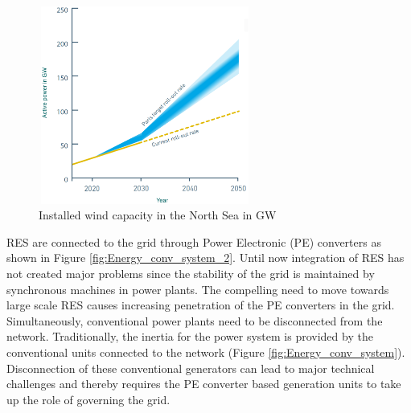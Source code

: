 \begin{figure}[H]
\centering
    \includegraphics[height = 6.5cm,width = 7cm]{Diagrams/Chapter_1/Paris.pdf}
    \caption{Installed wind capacity in the North Sea in GW \cite{noauthor_vision_nodate}}
    \label{fig:Paris_roll_out}
\end{figure}

\gls{RES} are connected to the grid through Power Electronic (\gls{PE}) converters as shown in Figure \ref{fig:Energy_conv_system_2}. Until now integration of \gls{RES} has not created major problems since the stability of the grid is maintained by synchronous machines in power plants. The compelling need to move towards large scale \gls{RES} causes increasing penetration of the \gls{PE} converters in the grid. Simultaneously, conventional power plants need to be disconnected from the network. Traditionally, the inertia for the power system is provided by the conventional units connected to the network (Figure \ref{fig:Energy_conv_system}). Disconnection of these conventional generators can lead to major technical challenges and thereby requires the \gls{PE} converter based generation units to take up the role of governing the grid.

